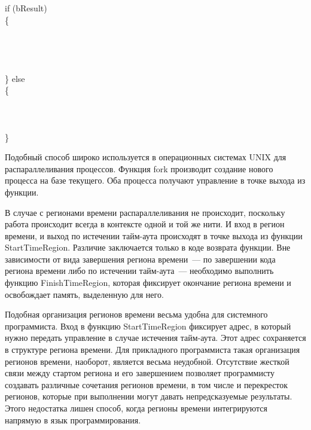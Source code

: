 \begin{multicols}{2}
{\noindent
{\sf if (bResult)}\\
{\sf \{}\\
\hspace*{5mm}{\sf    // Выполняется регион времени}\\
    \hspace*{5mm}{\sf \ldots}\\
\hspace*{5mm}{\sf    // Конец региона времени}\\
\hspace*{5mm}{\sf    FinishTimeRegion(pTimeRegion);}\\
{\sf \} else}\\
{\sf \{}
\hspace*{5mm}{\sf    // Конец региона времени}\\
\hspace*{5mm}{\sf    FinishTimeRegion(pTimeRegion);}\\
\hspace*{5mm}{\sf    // Действия по тайм-ауту}\\
\hspace*{5mm}{\sf \ldots }\\
{\sf \} }\\
}

   Подобный способ широко используется в операционных системах UNIX для
распараллеливания процессов. Функция fork производит создание нового процесса на базе
текущего. Оба процесса получают управление в точке выхода из функции.

В случае с регионами времени распараллеливания не происходит, поскольку работа
происходит всегда в контексте одной и той же нити. И вход в регион времени, и выход по
истечении тайм-аута происходят в точке выхода из функции StartTimeRegion. Различие
заключается только в коде возврата функции. Вне зависимости от вида завершения региона
времени~--- по завершении кода региона времени либо по истечении тайм-аута~--- необходимо
выполнить функцию FinishTimeRegion, которая фиксирует окончание региона времени и
осво\-бож\-да\-ет память, выделенную для него.

   Подобная организация регионов времени весьма удобна для системного программиста. Вход в
функцию StartTimeRegion фиксирует адрес, в который нужно передать управление в случае
истечения тайм-аута. Этот адрес сохраняется в структуре региона времени. Для прикладного
программиста такая организация регионов времени, наоборот, является весьма неудобной.
Отсутствие жесткой связи между стартом региона и его завершением позволяет программисту
создавать различные сочетания регионов времени, в том числе и перекресток регионов, которые
при выполнении могут давать непредсказуемые результаты. Этого недостатка лишен способ,
когда регионы времени интегрируются напрямую в язык программирования.


\end{multicols}
